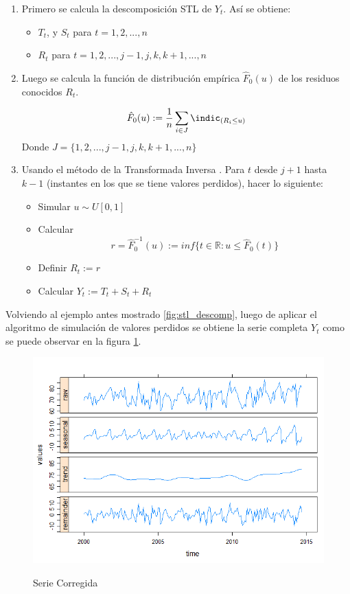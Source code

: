 \documentclass[12pt,oneside]{book}\usepackage[]{graphicx}\usepackage[]{color}
\theoremstyle{definition} %
\begin{document}
\begin{enumerate}
\item Primero se calcula la descomposición STL de $Y_t$. Así se obtiene:
\begin{itemize}
\item $T_t$, y $S_t$ para $t=1,2,...,n$
\item $R_t$ para $t=1,2,...,j-1,j,k,k+1,...,n$
\end{itemize}


\item Luego se calcula la función de distribución empírica $\hat{F}_0(u)$ de los residuos conocidos $R_t$.

$$\hat{F}_0(u):=\frac{1}{n}\sum_{i\in J} \indic_{(R_i\leq u)} $$
Donde $J=\{1,2,...,j-1,j,k,k+1,...,n\}$

\item Usando el método de la Transformada Inversa \cite{ross2006simulation}. Para $t$ desde $j+1$ hasta $k-1$ (instantes en los que se tiene valores perdidos), hacer lo siguiente:

\begin{itemize}
\item Simular $u\sim U[0,1]$
\item Calcular $$r = \hat{F}_0^{-1}(u) := inf\{ t\in \mathbb{R}: u\leq \hat{F}_0(t) \} $$
\item Definir $R_t := r$
\item Calcular $Y_t:=T_t+S_t+R_t$
\end{itemize}

\end{enumerate}


Volviendo al ejemplo antes mostrado \ref{fig:stl_descomp}, luego de aplicar el algoritmo de simulación de valores perdidos se obtiene la serie completa $Y_t$ como se puede observar en la figura \ref{fig:stl_descomp2}.

\begin{figure}[h]
\caption{Serie Corregida}
\includegraphics[width=15cm]{Cap2-MarcoTeorico/Cap2-Stl-Loess2.png}
\label{fig:stl_descomp2}
\centering
\end{figure}
\end{document}

